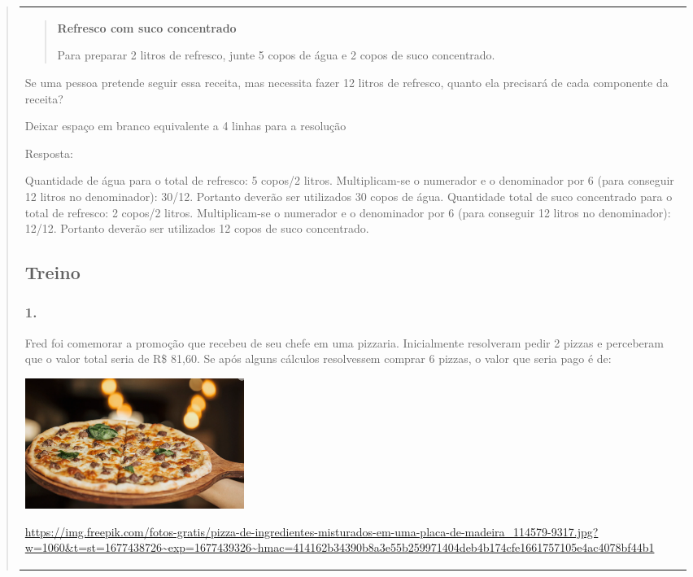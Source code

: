 \begin{enumerate}
\begin{escolha}
\begin{enumerate}
\begin{itemize}
\begin{itemize}
\begin{escolha}
\begin{quote}
\begin{escolha}
{\begin{longtable}[]{@{}l@{}}
\begin{itemize}
\begin{quote}
\textbf{Refresco com suco concentrado}

Para preparar 2 litros de refresco, junte 5 copos de água e 2 copos de suco concentrado.
\end{quote}

Se uma pessoa pretende seguir essa receita, mas necessita fazer 12
litros de refresco, quanto ela precisará de cada componente da receita?

Deixar espaço em branco equivalente a 4 linhas para a resolução

Resposta:

Quantidade de água para o total de refresco: 5 copos/2 litros.
Multiplicam-se o numerador e o denominador por 6 (para conseguir 12 litros no denominador): 30/12.
Portanto deverão ser utilizados 30 copos de água.
Quantidade total de suco concentrado para o total de refresco: 2 copos/2 litros.
Multiplicam-se o numerador e o denominador por 6 (para conseguir 12 litros no denominador): 12/12.
Portanto deverão ser utilizados 12 copos de suco concentrado.

\subsection{Treino}\label{treino-9}

\subsubsection{1.}\label{section-127}

Fred foi comemorar a promoção que recebeu de seu chefe em uma pizzaria.
Inicialmente resolveram pedir 2 pizzas e perceberam que o valor total
seria de R\$ 81,60. Se após alguns cálculos resolvessem comprar 6
pizzas, o valor que seria pago é de:

\includegraphics[width=2.80000in,height=1.66867in]{media/image132.png}

\url{https://img.freepik.com/fotos-gratis/pizza-de-ingredientes-misturados-em-uma-placa-de-madeira_114579-9317.jpg?w=1060\&t=st=1677438726~exp=1677439326~hmac=414162b34390b8a3e55b259971404deb4b174cfe1661757105e4ac4078bf44b1}


\end{itemize}
\end{longtable}}
\end{escolha}
\end{quote}
\end{escolha}
\end{itemize}
\end{itemize}
\end{enumerate}
\end{escolha}
\end{enumerate}
